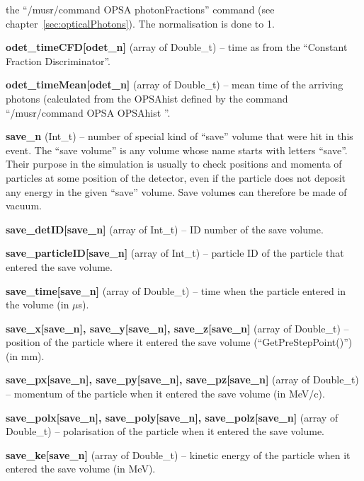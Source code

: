 \documentclass[twoside]{dis04}
\begin{document}
\begin{description}
	the ``/musr/command OPSA photonFractions'' command (see chapter~\ref{sec:opticalPhotons}).  The normalisation is done
	to 1.
\item{\bf odet\_timeCFD[odet\_n]} (array of Double\_t)
        -- time as from the ``Constant Fraction Discriminator''.
\item{\bf odet\_timeMean[odet\_n]} (array of Double\_t)
        -- mean time of the arriving photons (calculated from the OPSAhist defined by the command ``/musr/command OPSA OPSAhist ''.
\item{\bf save\_n} (Int\_t) -- number of special kind of ``save'' volume that were hit in this event. The ``save volume'' is
	any volume whose name starts with letters ``save''.  Their purpose in the simulation is usually to check positions
        and momenta of particles at some position of the detector, even if the particle does not deposit any energy in
        the given ``save'' volume.  Save volumes can therefore be made of vacuum.
\item{\bf save\_detID[save\_n]} (array of Int\_t) --  ID number of the save volume.
\item{\bf save\_particleID[save\_n]} (array of Int\_t) -- particle ID of the particle that entered the save volume.
\item{\bf save\_time[save\_n]} (array of Double\_t) -- time when the particle entered in the volume (in $\mu$s).
\item{\bf save\_x[save\_n], save\_y[save\_n], save\_z[save\_n]} (array of Double\_t) -- position of the particle where it
        entered the save volume (``GetPreStepPoint()'') (in mm).
\item{\bf save\_px[save\_n], save\_py[save\_n], save\_pz[save\_n]} (array of Double\_t) -- momentum of the particle when it
        entered the save volume (in MeV/c). 
\item{\bf save\_polx[save\_n], save\_poly[save\_n], save\_polz[save\_n]} (array of Double\_t) -- polarisation of the particle when it
        entered the save volume. 
\item{\bf save\_ke[save\_n]} (array of Double\_t) -- kinetic energy of the particle when it
        entered the save volume (in MeV). 
\end{description}

\end{document}

